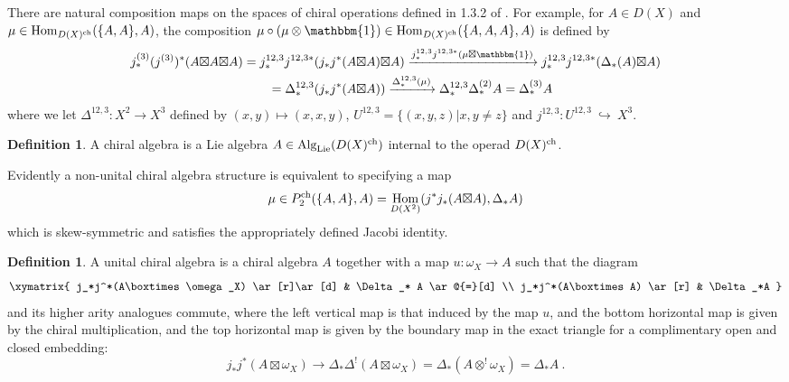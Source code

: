 \documentclass[11pt]{amsart}
\numberwithin{equation}{section}
\theoremstyle{definition}
\newtheorem{defn}[theo]{Definition}
\DeclareMathOperator{\Hom}{Hom}
\newcommand{\into}{{\ \hookrightarrow\ }}
\newcommand{\Alg}{{\textup{Alg}}}
\newcommand{\Lie}{{\textup{Lie}}}
\newcommand{\ch}{{\textup{ch}}}
\newcommand{\boxt}{{{\boxtimes }}}
\newcommand{\0}{{\textbf{0}}}
\newcommand{\DD}{{D}}
\newcommand{\id}{{\textup{id}}}
\def\ch{{\rm ch}}
\def \id{\mathbbm{1}}
\begin{document}
There are natural composition maps on the spaces of chiral operations defined in 1.3.2 of \cite{BD1}.
For example, for $A\in\DD(X)$ and $\mu\in \Hom_{\DD(X)^\ch}(\{A,A\},A)$, the composition $\mu \circ (\mu \otimes \id) \in \Hom_{\DD(X)^\ch}(\{A,A,A\},A)$ is defined by
\begin{align*}
	j^{(3)}_*(j^{(3)})^*( A\boxt A \boxt A)  & =  j^{12,3}_*j^{12,3 *}( j_*j^*(A\boxt A) \boxt A) \xrightarrow{j^{12,3}_*j^{12,3 *}( \mu\boxt \id)} j^{12,3}_*j^{12,3 *}(\Delta_*(A)\boxt A) \\
	& \quad\quad = \Delta^{12,3}_*(j_*j^*(A\boxt A)) \xrightarrow{ \Delta^{12,3}_*(\mu)} \Delta^{12,3}_* \Delta^{(2)}_*A=\Delta^{(3)}_*A 
\end{align*}
where we let $\Delta^{12,3}:X^2\to X^3$ defined by $(x,y)\mapsto (x,x,y)$, $U^{12,3}=\{(x,y,z)| x,y\neq  z\}$ and $j^{12,3}:U^{12,3}\into X^3$.

\begin{defn}
	 A chiral algebra is a Lie algebra $A\in \Alg_{\Lie}( \DD(X)^\ch)$ internal to the operad $\DD(X)^\ch$.
	\end{defn}
	
	Evidently a non-unital chiral algebra structure is equivalent to specifying a map
	$$ \mu \in P_2^\ch( \{ A,A\},A)=\Hom_{\DD(X^2) }( j^*j_*(A\boxt A) , \Delta_*A)$$
	which is skew-symmetric and satisfies the appropriately defined Jacobi identity.
	
	\begin{defn}
	 A unital chiral algebra is a chiral algebra $A$ together with a map $u:\omega_X\to A$ such that the diagram
	 \begin{equation}\label{unchdiagram} \xymatrix{ j_*j^*(A\boxtimes \omega_X) \ar[r]\ar[d] & \Delta_* A \ar@{=}[d] \\ j_*j^*(A\boxtimes A) \ar[r] & \Delta_*A } 
	 \end{equation}
	 and its higher arity analogues commute, where the left vertical map is that induced by the map $u$, and the bottom horizontal map is given by the chiral multiplication, and the top horizontal map is given by the boundary map in the exact triangle for a complimentary open and closed embedding:
	 \[j_*j^*(A\boxtimes \omega_X)  \to \Delta_* \Delta^!(A\boxtimes \omega_X) =\Delta_* (A \otimes^! \omega_X) = \Delta_* A \ .  \]

\end{defn}
\end{document}
